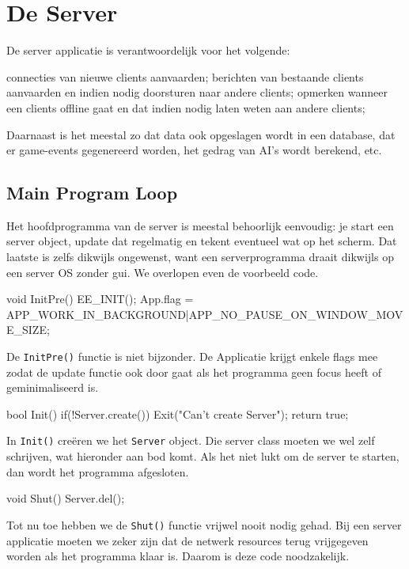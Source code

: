 \chapter{De Server}
De server applicatie is verantwoordelijk voor het volgende:

\begin{itemize}
\tick connecties van nieuwe clients aanvaarden;
\tick berichten van bestaande clients aanvaarden en indien nodig doorsturen naar andere clients;
\tick opmerken wanneer een clients offline gaat en dat indien nodig laten weten aan andere clients;
\end{itemize}

Daarnaast is het meestal zo dat data ook opgeslagen wordt in een database, dat er game-events gegenereerd worden, het gedrag van AI's wordt berekend, etc.

\section{Main Program Loop}
Het hoofdprogramma van de server is meestal behoorlijk eenvoudig: je start een server object, update dat regelmatig en tekent eventueel wat op het scherm. Dat laatste is zelfs dikwijls ongewenst, want een serverprogramma draait dikwijls op een server OS zonder gui. We overlopen even de voorbeeld code.

\begin{code}
void InitPre()
{
   EE_INIT();
   App.flag = APP_WORK_IN_BACKGROUND|APP_NO_PAUSE_ON_WINDOW_MOVE_SIZE;
}
\end{code}

De \texttt{InitPre()} functie is niet bijzonder. De Applicatie krijgt enkele flags mee zodat de update functie ook door gaat als het programma geen focus heeft of geminimaliseerd is.

\begin{code}
bool Init()
{
   if(!Server.create())
   {
      Exit("Can't create Server");
   }
   return true;
}
\end{code}

In \texttt{Init()} cre\"eren we het \texttt{Server} object. Die server class moeten we wel zelf schrijven, wat hieronder aan bod komt. Als het niet lukt om de server te starten, dan wordt het programma afgesloten.

\begin{code}
void Shut()
{
   Server.del();
}
\end{code}

Tot nu toe hebben we de \texttt{Shut()} functie vrijwel nooit nodig gehad. Bij een server applicatie moeten we zeker zijn dat de netwerk resources terug vrijgegeven worden als het programma klaar is. Daarom is deze code noodzakelijk.

